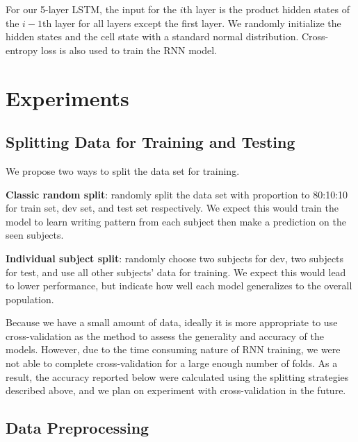 \documentclass{article}
\begin{document}
\begin{multicols*}{2}
For our 5-layer LSTM, the input for the $i$th layer is the product hidden states of the $i-1$th layer for all layers except the first layer. We randomly initialize the hidden states and the cell state with a standard normal distribution. Cross-entropy loss is also used to train the RNN model.


\section{Experiments}


\subsection{Splitting Data for Training and Testing}

We propose two ways to split the data set for training.

\textbf{Classic random split}: randomly split the data set with proportion to 80:10:10 for train set, dev set, and test set respectively. We expect this would train the model to learn writing pattern from each subject then make a prediction on the seen subjects.

\textbf{Individual subject split}: randomly choose two subjects for dev, two subjects for test, and use all other subjects' data for training. We expect this would lead to lower performance, but indicate how well each model generalizes to the overall population.

Because we have a small amount of data, ideally it is more appropriate to use cross-validation as the method to assess the generality and accuracy of the models. However, due to the time consuming nature of RNN training, we were not able to complete cross-validation for a large enough number of folds. As a result, the accuracy reported below were calculated using the splitting strategies described above, and we plan on experiment with cross-validation in the future.

\subsection{Data Preprocessing}

\end{multicols*}
\end{document}
